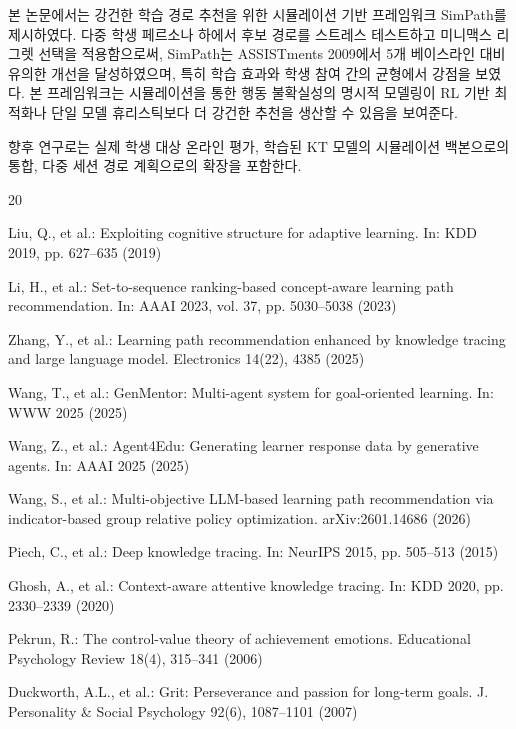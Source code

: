 \documentclass[runningheads]{llncs}
\begin{document}
본 논문에서는 강건한 학습 경로 추천을 위한 시뮬레이션 기반 프레임워크 SimPath를 제시하였다.
다중 학생 페르소나 하에서 후보 경로를 스트레스 테스트하고 미니맥스 리그렛 선택을 적용함으로써, SimPath는 ASSISTments 2009에서 5개 베이스라인 대비 유의한 개선을 달성하였으며, 특히 학습 효과와 학생 참여 간의 균형에서 강점을 보였다.
본 프레임워크는 시뮬레이션을 통한 행동 불확실성의 명시적 모델링이 RL 기반 최적화나 단일 모델 휴리스틱보다 더 강건한 추천을 생산할 수 있음을 보여준다.

향후 연구로는 실제 학생 대상 온라인 평가, 학습된 KT 모델의 시뮬레이션 백본으로의 통합, 다중 세션 경로 계획으로의 확장을 포함한다.


\begin{thebibliography}{20}

Liu, Q., et al.: Exploiting cognitive structure for adaptive learning. In: KDD 2019, pp. 627--635 (2019)

Li, H., et al.: Set-to-sequence ranking-based concept-aware learning path recommendation. In: AAAI 2023, vol. 37, pp. 5030--5038 (2023)

Zhang, Y., et al.: Learning path recommendation enhanced by knowledge tracing and large language model. Electronics 14(22), 4385 (2025)

Wang, T., et al.: GenMentor: Multi-agent system for goal-oriented learning. In: WWW 2025 (2025)

Wang, Z., et al.: Agent4Edu: Generating learner response data by generative agents. In: AAAI 2025 (2025)

Wang, S., et al.: Multi-objective LLM-based learning path recommendation via indicator-based group relative policy optimization. arXiv:2601.14686 (2026)

Piech, C., et al.: Deep knowledge tracing. In: NeurIPS 2015, pp. 505--513 (2015)

Ghosh, A., et al.: Context-aware attentive knowledge tracing. In: KDD 2020, pp. 2330--2339 (2020)

Pekrun, R.: The control-value theory of achievement emotions. Educational Psychology Review 18(4), 315--341 (2006)

Duckworth, A.L., et al.: Grit: Perseverance and passion for long-term goals. J. Personality \& Social Psychology 92(6), 1087--1101 (2007)


\end{thebibliography}
\end{document}
